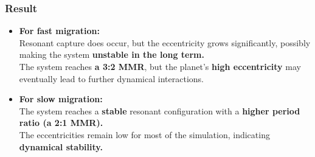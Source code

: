 \documentclass[12pt,a4paper]{article}
\begin{document}
\subsubsection{Result}
\begin{itemize}
    \item \textbf{For fast migration:}
    \\ Resonant capture does occur, but the eccentricity grows significantly, possibly making the system \textbf{unstable in the long term.} 
    \\ The system reaches \textbf{a 3:2 MMR}, but the planet’s \textbf{high eccentricity} may eventually lead to further dynamical interactions.
    \item \textbf{For slow migration:}
    \\ The system reaches a \textbf{stable} resonant configuration with a \textbf{higher period ratio (a 2:1 MMR).}
    \\ The eccentricities remain low for most of the simulation, indicating \textbf{dynamical stability.}
\end{itemize}





\end{document}
